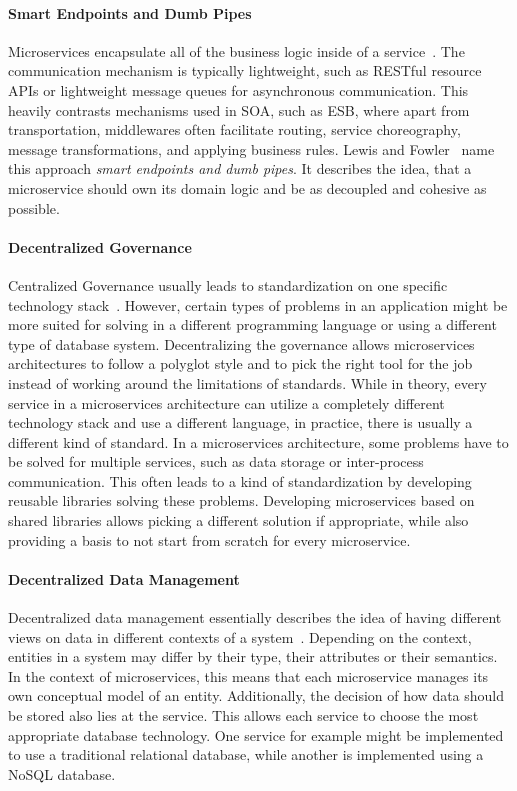 \paragraph{Smart Endpoints and Dumb Pipes}

Microservices encapsulate all of the business logic inside of a service~\cite{Lewis2014}.
The communication mechanism is typically lightweight, such as \ac{REST}ful resource \acp{API} or lightweight message queues for asynchronous communication.
This heavily contrasts mechanisms used in \ac{SOA}, such as \ac{ESB}, where apart from transportation, middlewares often facilitate routing, service choreography, message transformations, and applying business rules.
Lewis and Fowler~\cite{Lewis2014} name this approach \textit{smart endpoints and dumb pipes}.
It describes the idea, that a microservice should own its domain logic and be as decoupled and cohesive as possible.

\paragraph{Decentralized Governance}

Centralized Governance usually leads to standardization on one specific technology stack~\cite{Lewis2014}.
However, certain types of problems in an application might be more suited for solving in a different programming language or using a different type of database system.
Decentralizing the governance allows microservices architectures to follow a polyglot style and to pick the right tool for the job instead of working around the limitations of standards.
While in theory, every service in a microservices architecture can utilize a completely different technology stack and use a different language, in practice, there is usually a different kind of standard.
In a microservices architecture, some problems have to be solved for multiple services, such as data storage or inter-process communication.
This often leads to a kind of standardization by developing reusable libraries solving these problems.
Developing microservices based on shared libraries allows picking a different solution if appropriate, while also providing a basis to not start from scratch for every microservice.


\paragraph{Decentralized Data Management}

Decentralized data management essentially describes the idea of having different views on data in different contexts of a system~\cite{Lewis2014, Balalaie2016, Taibi2020}.
Depending on the context, entities in a system may differ by their type, their attributes or their semantics.
In the context of microservices, this means that each microservice manages its own conceptual model of an entity.
Additionally, the decision of how data should be stored also lies at the service.
This allows each service to choose the most appropriate database technology.
One service for example might be implemented to use a traditional relational database, while another is implemented using a NoSQL database.

